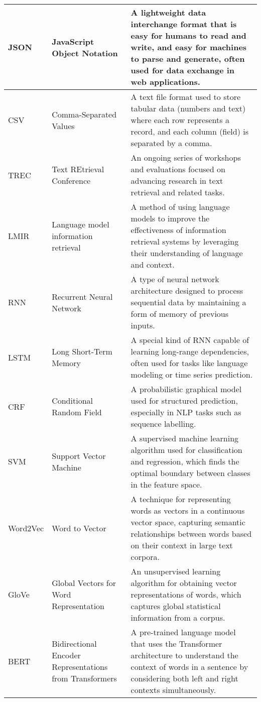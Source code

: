 \begin{tabularx}{\textwidth}{
  >{\raggedright\arraybackslash}p{2.5cm}
  >{\raggedright\arraybackslash}p{4cm}
  >{\noindent\justifying\arraybackslash}X
}
\cmidrule(lr){1-3}
JSON  & JavaScript Object Notation & A lightweight data interchange format that is easy for humans to read and write, and easy for machines to parse and generate, often used for data exchange in web applications. \\
\cmidrule(lr){1-3}
CSV & Comma-Separated Values & A text file format used to store tabular data (numbers and text) where each row represents a record, and each column (field) is separated by a comma. \\
\cmidrule(lr){1-3}
TREC  & Text REtrieval Conference & An ongoing series of workshops and evaluations focused on advancing research in text retrieval and related tasks. \\
\cmidrule(lr){1-3}
LMIR & Language model information retrieval & A method of using language models to improve the effectiveness of information retrieval systems by leveraging their understanding of language and context. \\
\cmidrule(lr){1-3}
RNN   & Recurrent Neural Network & A type of neural network architecture designed to process sequential data by maintaining a form of memory of previous inputs. \\
\cmidrule(lr){1-3}
LSTM  & Long Short-Term Memory & A special kind of RNN capable of learning long-range dependencies, often used for tasks like language modeling or time series prediction. \\
\cmidrule(lr){1-3}
CRF   & Conditional Random Field & A probabilistic graphical model used for structured prediction, especially in NLP tasks such as sequence labelling. \\
\cmidrule(lr){1-3}
SVM   & Support Vector Machine & A supervised machine learning algorithm used for classification and regression, which finds the optimal boundary between classes in the feature space. \\
\cmidrule(lr){1-3}
Word2Vec & Word to Vector & A technique for representing words as vectors in a continuous vector space, capturing semantic relationships between words based on their context in large text corpora. \\
\cmidrule(lr){1-3}
GloVe  & Global Vectors for Word Representation & An unsupervised learning algorithm for obtaining vector representations of words, which captures global statistical information from a corpus. \\
\cmidrule(lr){1-3}
BERT  & Bidirectional Encoder Representations from Transformers & A pre-trained language model that uses the Transformer architecture to understand the context of words in a sentence by considering both left and right contexts simultaneously. \\

\end{tabularx}
